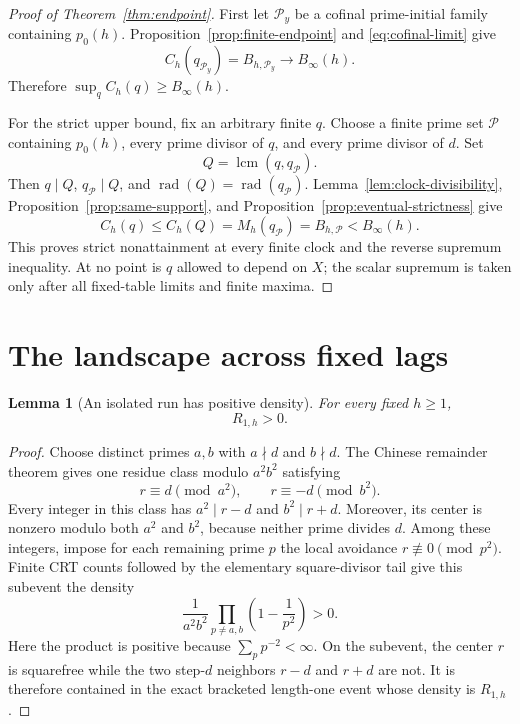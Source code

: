 \documentclass[11pt]{article}
\newtheorem{lemma}[theorem]{Lemma}
\theoremstyle{definition}
\theoremstyle{remark}
\newcommand{\rad}{\operatorname{rad}}
\begin{document}
\begin{proof}[Proof of Theorem~\ref{thm:endpoint}]
First let \(\mathcal P_y\) be a cofinal prime-initial family containing
\(p_0(h)\).  Proposition~\ref{prop:finite-endpoint} and
\eqref{eq:cofinal-limit} give
\[
 C_h(q_{\mathcal P_y})=B_{h,\mathcal P_y}
 \longrightarrow B_\infty(h).
\]
Therefore \(\sup_q C_h(q)\geq B_\infty(h)\).

For the strict upper bound, fix an arbitrary finite \(q\).  Choose a
finite prime set \(\mathcal P\) containing \(p_0(h)\), every prime divisor
of \(q\), and every prime divisor of \(d\).  Set
\[
 Q=\operatorname{lcm}(q,q_{\mathcal P}).
\]
Then \(q\mid Q\), \(q_{\mathcal P}\mid Q\), and
\(\rad(Q)=\rad(q_{\mathcal P})\).  Lemma~\ref{lem:clock-divisibility},
Proposition~\ref{prop:same-support}, and
Proposition~\ref{prop:eventual-strictness} give
\[
 C_h(q)\leq C_h(Q)=M_h(q_{\mathcal P})
 =B_{h,\mathcal P}<B_\infty(h).
\]
This proves strict nonattainment at every finite clock and the reverse
supremum inequality.  At no point is \(q\) allowed to depend on \(X\);
the scalar supremum is taken only after all fixed-table limits and finite
maxima.
\end{proof}

\section{The landscape across fixed lags}

\begin{lemma}[An isolated run has positive density]
\label{lem:isolated-positive}
For every fixed \(h\geq1\),
\[
 R_{1,h}>0.
\]
\end{lemma}

\begin{proof}
Choose distinct primes \(a,b\) with \(a\nmid d\) and \(b\nmid d\).
The Chinese remainder theorem gives one residue class modulo
\(a^2b^2\) satisfying
\begin{equation}
 r\equiv d\pmod{a^2},\qquad
 r\equiv-d\pmod{b^2}.
 \label{eq:isolated-congruences}
\end{equation}
Every integer in this class has \(a^2\mid r-d\) and
\(b^2\mid r+d\).  Moreover, its center is nonzero modulo both
\(a^2\) and \(b^2\), because neither prime divides \(d\).  Among these
integers, impose for each remaining prime \(p\) the local avoidance
\(r\not\equiv0\pmod{p^2}\).  Finite CRT counts followed by the
elementary square-divisor tail give this subevent the density
\[
 \frac1{a^2b^2}
 \prod_{p\ne a,b}\left(1-\frac1{p^2}\right)>0.
\]
Here the product is positive because \(\sum_p p^{-2}<\infty\).  On the
subevent, the center \(r\) is squarefree while the two step-\(d\)
neighbors \(r-d\) and \(r+d\) are not.  It is therefore contained in
the exact bracketed length-one event whose density is \(R_{1,h}\).
\end{proof}
\end{document}
